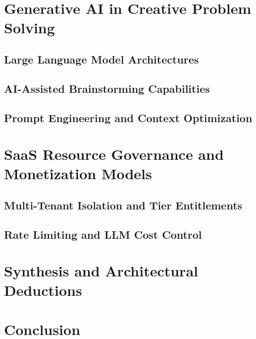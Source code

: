\section{Generative AI in Creative Problem Solving}
\label{sec:ch2_gen_ai}
\subsection{Large Language Model Architectures}
\label{subsec:ch2_llm_architectures}

\subsection{AI-Assisted Brainstorming Capabilities}
\label{subsec:ch2_ai_capabilities}

\subsection{Prompt Engineering and Context Optimization}
\label{subsec:ch2_prompt_engineering}

\section{SaaS Resource Governance and Monetization Models}
\label{sec:ch2_saas_governance}
\subsection{Multi-Tenant Isolation and Tier Entitlements}
\label{subsec:ch2_tenant_isolation}

\subsection{Rate Limiting and LLM Cost Control}
\label{subsec:ch2_rate_limiting}

\section{Synthesis and Architectural Deductions}
\label{sec:ch2_synthesis}

\section{Conclusion}
\label{sec:ch2_conclusion}
